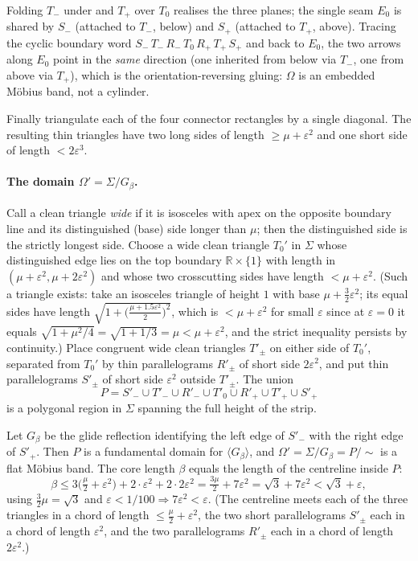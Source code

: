 \documentclass[12pt]{article}
\newcommand{\R}{\mathbb{R}}
\newcommand{\eps}{\varepsilon}
\newcommand{\Sig}{\Sigma}
\begin{document}
Folding $T_-$ under and $T_+$ over $T_0$ realises the three planes; the
single seam $E_0$ is shared by $S_-$ (attached to $T_-$, below) and $S_+$
(attached to $T_+$, above). Tracing the cyclic boundary word
$S_-\,T_-\,R_-\,T_0\,R_+\,T_+\,S_+$ and back to $E_0$, the two arrows
along $E_0$ point in the \emph{same} direction (one inherited from below
via $T_-$, one from above via $T_+$), which is the orientation-reversing
gluing: $\Omega$ is an embedded M\"obius band, not a cylinder.

Finally triangulate each of the four connector rectangles by a single
diagonal. The resulting thin triangles have two long sides of length
$\ge\mu+\eps^2$ and one short side of length $<2\eps^3$.

\paragraph{The domain $\Omega'=\Sig/G_\beta$.}
Call a clean triangle \emph{wide} if it is isosceles with apex on the
opposite boundary line and its distinguished (base) side longer than
$\mu$; then the distinguished side is the strictly longest side. Choose a
wide clean triangle $T_0'$ in $\Sig$ whose distinguished edge lies on the
top boundary $\R\times\{1\}$ with length in $(\mu+\eps^2,\mu+2\eps^2)$ and
whose two crosscutting sides have length $<\mu+\eps^2$. (Such a triangle
exists: take an isosceles triangle of height $1$ with base
$\mu+\tfrac32\eps^2$; its equal sides have length
$\sqrt{1+\big(\tfrac{\mu+1.5\eps^2}{2}\big)^2}$, which is $<\mu+\eps^2$
for small $\eps$ since at $\eps=0$ it equals
$\sqrt{1+\mu^2/4}=\sqrt{1+1/3}=\mu<\mu+\eps^2$, and the strict inequality
persists by continuity.) Place congruent wide clean triangles $T'_\pm$ on
either side of $T_0'$, separated from $T_0'$ by thin parallelograms
$R'_\pm$ of short side $2\eps^2$, and put thin parallelograms $S'_\pm$ of
short side $\eps^2$ outside $T'_\pm$. The union
\[
P=S'_-\cup T'_-\cup R'_-\cup T'_0\cup R'_+\cup T'_+\cup S'_+
\]
is a polygonal region in $\Sig$ spanning the full height of the strip.

Let $G_\beta$ be the glide reflection identifying the left edge of $S'_-$
with the right edge of $S'_+$. Then $P$ is a fundamental domain for
$\langle G_\beta\rangle$, and $\Omega'=\Sig/G_\beta=P/\!\!\sim$ is a flat
M\"obius band. The core length $\beta$ equals the length of the centreline
inside $P$:
\[
\beta\le 3\Big(\tfrac\mu2+\eps^2\Big)+2\cdot\eps^2+2\cdot 2\eps^2
=\tfrac{3\mu}{2}+7\eps^2=\sqrt3+7\eps^2<\sqrt3+\eps,
\]
using $\tfrac32\mu=\sqrt3$ and $\eps<1/100\Rightarrow7\eps^2<\eps$.
(The centreline meets each of the three triangles in a chord of length
$\le\tfrac\mu2+\eps^2$, the two short parallelograms $S'_\pm$ each in a
chord of length $\eps^2$, and the two parallelograms $R'_\pm$ each in a
chord of length $2\eps^2$.)
\end{document}
